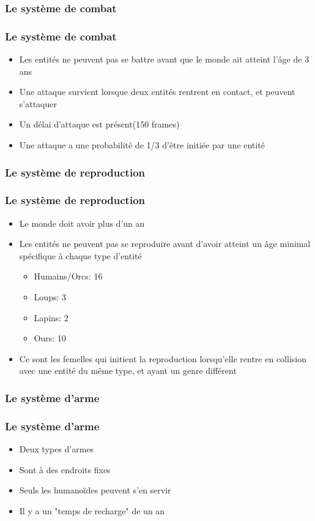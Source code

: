 \documentclass{beamer}
\begin{document}
\subsubsection{Le système de combat}

\begin{frame} \frametitle{Le système de combat}
	\begin{itemize}
		\item Les entités ne peuvent pas se battre avant que le monde ait atteint l'âge de 3 ans
		\item Une attaque survient lorsque deux entités rentrent en contact, et peuvent s'attaquer
		\item Un délai d'attaque est présent(150 frames)
		\item Une attaque a une probabilité de 1/3 d'être initiée par une entité
	\end{itemize}
\end{frame}

\subsubsection{Le système de reproduction}

\begin{frame} \frametitle{Le système de reproduction}
	\begin{itemize}
		\item Le monde doit avoir plus d'un an
		\item Les entités ne peuvent pas se reproduire avant d'avoir atteint un âge minimal spécifique à chaque type d'entité
			\begin{itemize}
				\item Humains/Orcs: 16
				\item Loups: 3
				\item Lapins: 2
				\item Ours: 10
			\end{itemize}
		\item Ce sont les femelles qui initient la reproduction lorsqu'elle rentre en collision avec une entité du même type, et ayant un genre différent
	\end{itemize}
\end{frame}

\subsubsection{Le système d'arme}

\begin{frame} \frametitle{Le système d'arme}
	\begin{itemize}
		\item Deux types d'armes
		\item Sont à des endroits fixes
		\item Seuls les humanoïdes peuvent s'en servir
		\item Il y a un "temps de recharge" de un an
	\end{itemize}
\end{frame}
\end{document}
